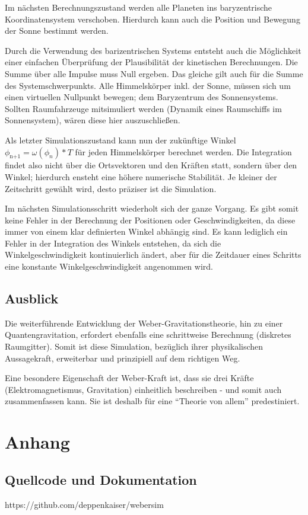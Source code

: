 \documentclass{book}
\begin{document}
Im nächsten Berechnungszustand werden alle Planeten ins baryzentrische Koordinatensystem verschoben. Hierdurch kann auch die
Position und Bewegung der Sonne bestimmt werden.

Durch die Verwendung des barizentrischen Systems entsteht auch die Möglichkeit einer einfachen Überprüfung der Plausibilität der
kinetischen Berechnungen. Die Summe über alle Impulse muss Null ergeben. Das gleiche gilt auch für die Summe des Systemschwerpunkts.
Alle Himmelskörper inkl. der Sonne, müssen sich um einen virtuellen Nullpunkt bewegen; dem Baryzentrum des Sonnensystems. Sollten
Raumfahrzeuge mitsimuliert werden (Dynamik eines Raumschiffs im Sonnensystem), wären diese hier auszuschließen.

Als letzter Simulationszustand kann nun der zukünftige Winkel $\phi_\text{n+1} = \omega(\phi_n) * T$ für jeden Himmelskörper
berechnet werden. Die Integration findet also nicht über die Ortsvektoren und den Kräften statt, sondern über den Winkel; hierdurch
ensteht eine höhere numerische Stabilität. Je kleiner der Zeitschritt gewählt wird, desto präziser ist die Simulation.

Im nächsten Simulationsschritt wiederholt sich der ganze Vorgang. Es gibt somit keine Fehler in der Berechnung der Positionen
oder Geschwindigkeiten, da diese immer von einem klar definierten Winkel abhängig sind. Es kann lediglich ein Fehler in der
Integration des Winkels entstehen, da sich die Winkelgeschwindigkeit kontinuierlich ändert, aber für die Zeitdauer eines Schritts
eine konstante Winkelgeschwindigkeit angenommen wird.

\section{Ausblick}
Die weiterführende Entwicklung der Weber-Gravitationstheorie, hin zu einer Quantengravitation, erfordert ebenfalls eine schrittweise
Berechnung (diskretes Raumgitter). Somit ist diese Simulation, bezüglich ihrer physikalischen Aussagekraft, erweiterbar und prinzipiell
auf dem richtigen Weg.

Eine besondere Eigenschaft der Weber-Kraft ist, dass sie drei Kräfte (Elektromagnetismus, Gravitation) einheitlich beschreiben - und
somit auch zusammenfassen kann. Sie ist deshalb für eine \enquote{Theorie von allem} predestiniert.

\chapter{Anhang}
\section{Quellcode und Dokumentation}
https://github.com/deppenkaiser/webersim
\end{document}
